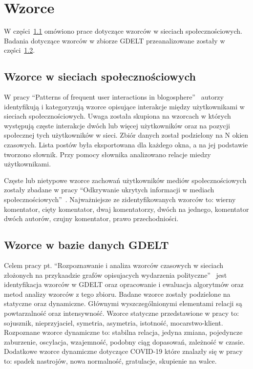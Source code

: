 \documentclass[11pt]{report}
\begin{document}
    \section{Wzorce}\label{sec:wzorce}
    W części~\ref{subsec:wzorce-w-sieciach-społecznościowych} omówiono prace dotyczące wzorców w sieciach społecznościowych.
    Badania dotyczące wzorców w zbiorze GDELT przeanalizowane zostały w części~\ref{subsec:wzorce-gdelt}.

    \subsection{Wzorce w sieciach społecznościowych}\label{subsec:wzorce-w-sieciach-społecznościowych}
    W pracy ``Patterns of frequent user interactions in blogosphere''~\cite{10.1093/jigpal/jzaa042} autorzy identyfikują i kategoryzują wzorce opisujące interakcje między użytkownikami w sieciach społecznościowych.
    Uwaga została skupiona na wzorcach w których występują częste interakcje dwóch lub więcej użytkowników oraz na pozycji społecznej tych użytkowników w sieci.
    Zbiór danych został podzielony na N okien czasowych.
    Lista postów była eksportowana dla każdego okna, a na jej podstawie tworzono słownik.
    Przy pomocy słownika analizowano relacje miedzy użytkownikami.

    Częste lub nietypowe wzorce zachowań użytkowników mediów społecznościowych
    zostały zbadane w pracy ``Odkrywanie ukrytych informacji w mediach społecznościowych''~\cite{Skwara2019}.
    Najważniejsze ze zidentyfikowanych wzorców to: wierny komentator, cięty komentator, dwaj komentatorzy, dwóch na jednego, komentator dwóch autorów, czujny komentator, prawo przechodniości.

    \subsection{Wzorce w bazie danych GDELT}\label{subsec:wzorce-gdelt}
    Celem pracy pt. ``Rozpoznawanie i analiza wzorców czasowych w sieciach złożonych na przykaadzie grafów opisujacych wydarzenia polityczne''~\cite{Jarosz2020}
    jest identyfikacja wzorców w GDELT oraz opracowanie i ewaluacja algorytmów oraz metod analizy wzorców z tego zbioru.
    Badane wzorce zostały podzielone na statyczne oraz dynamiczne.
    Głównymi wyszczególnionymi elementami relacji są powtarzalność oraz intensywność.
    Wzorce statyczne przedstawione w pracy to: sojusznik, nieprzyjaciel, symetria, asymetria, istotność, mocarstwo-klient.
    Rozpoznane wzorce dynamiczne to: stabilna relacja, jedyna zmiana, pojedyncze zaburzenie, oscylacja, wzajemność, podobny ciąg dopasowań, zależność w czasie.
    Dodatkowe wzorce dynamiczne dotyczące COVID-19 które znalazły się w pracy to: spadek nastrojów, nowa normalność, gratulacje, skupienie na walce.
\end{document}
